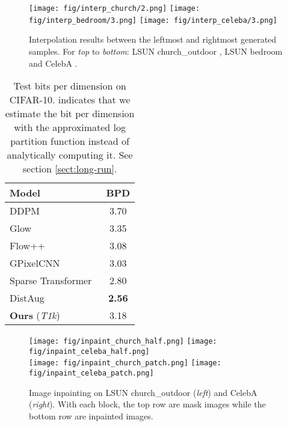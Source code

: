 \documentclass{article} \usepackage{iclr2021_conference,times}
\begin{document}
\begin{figure}[ht]
\begin{center}
\texttt{[image: fig/interp\_church/2.png]} 
\texttt{[image: fig/interp\_bedroom/3.png]}
\texttt{[image: fig/interp\_celeba/3.png]}
\end{center}
\caption{Interpolation results between the leftmost and rightmost generated samples. For {\em top} to {\em bottom}: LSUN church\_outdoor , LSUN bedroom  and CelebA . } 
\label{fig: interp}
\end{figure}
\begin{center}
	\begin{minipage}[c]{.46\textwidth}
		\begin{table}[H]
\centering
	\caption{Test bits per dimension on CIFAR-10.  indicates that we estimate the bit per dimension with the approximated log partition function instead of analytically computing it. See section \ref{sect:long-run}. } 
\footnotesize
	 \setlength\tabcolsep{2.5pt}
 \begin{tabular}{lc} 
    \toprule
    Model & BPD \\
    \midrule
    DDPM~\citep{ho2020denoising} & 3.70 \\
    Glow~\citep{kingma2018glow} & 3.35 \\
    Flow++~\citep{ho2019flow++} & 3.08 \\
    GPixelCNN~\citep{van2016conditional} & 3.03 \\
    Sparse Transformer~\citep{child2019generating} & 2.80 \\
    DistAug~\citep{icml2020_6095} & {\bf 2.56} \\
    {\bf Ours} ({\em T1k}) & 3.18 \\
        \bottomrule 
    \end{tabular}
    \label{tabl: bpd}
\end{table}
	\end{minipage}
	\begin{minipage}[c]{.53\textwidth}
\begin{figure}[H]
\begin{center}
\texttt{[image: fig/inpaint\_church\_half.png]} 
\texttt{[image: fig/inpaint\_celeba\_half.png]}\\
\vspace{1mm}
\texttt{[image: fig/inpaint\_church\_patch.png]} 
\texttt{[image: fig/inpaint\_celeba\_patch.png]}\\
\end{center}
\caption{Image inpainting on LSUN church\_outdoor  ({\em left}) and CelebA  ({\em right}). With each block, the top row are mask images while the bottom row are inpainted images.} 
\label{fig: inpaint}
\end{figure} 
	\end{minipage}
\end{center}
\end{document}
